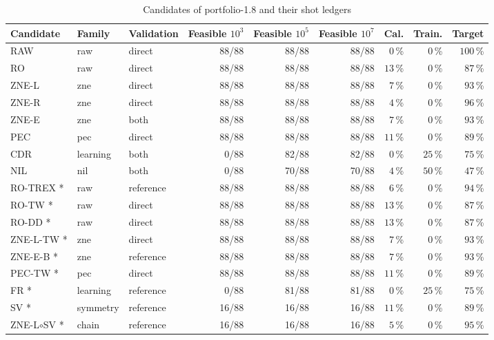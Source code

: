 \begin{table}[p]
\centering
\footnotesize
\setlength{\tabcolsep}{3.0pt}
\caption{Candidates of portfolio-1.8 and their shot ledgers}
\label{tab:qem180-candidates}
\begin{tabular}{lllrrrrrr}
\toprule
Candidate & Family & Validation & Feasible $10^3$ & Feasible $10^5$ & Feasible $10^7$ & Cal. & Train. & Target \\
\midrule
RAW & raw & direct & 88/88 & 88/88 & 88/88 & $0$\,\% & $0$\,\% & $100$\,\% \\
RO & raw & direct & 88/88 & 88/88 & 88/88 & $13$\,\% & $0$\,\% & $87$\,\% \\
ZNE-L & zne & direct & 88/88 & 88/88 & 88/88 & $7$\,\% & $0$\,\% & $93$\,\% \\
ZNE-R & zne & direct & 88/88 & 88/88 & 88/88 & $4$\,\% & $0$\,\% & $96$\,\% \\
ZNE-E & zne & both & 88/88 & 88/88 & 88/88 & $7$\,\% & $0$\,\% & $93$\,\% \\
PEC & pec & direct & 88/88 & 88/88 & 88/88 & $11$\,\% & $0$\,\% & $89$\,\% \\
CDR & learning & both & 0/88 & 82/88 & 82/88 & $0$\,\% & $25$\,\% & $75$\,\% \\
NIL & nil & both & 0/88 & 70/88 & 70/88 & $4$\,\% & $50$\,\% & $47$\,\% \\
RO-TREX * & raw & reference & 88/88 & 88/88 & 88/88 & $6$\,\% & $0$\,\% & $94$\,\% \\
RO-TW * & raw & direct & 88/88 & 88/88 & 88/88 & $13$\,\% & $0$\,\% & $87$\,\% \\
RO-DD * & raw & direct & 88/88 & 88/88 & 88/88 & $13$\,\% & $0$\,\% & $87$\,\% \\
ZNE-L-TW * & zne & direct & 88/88 & 88/88 & 88/88 & $7$\,\% & $0$\,\% & $93$\,\% \\
ZNE-E-B * & zne & reference & 88/88 & 88/88 & 88/88 & $7$\,\% & $0$\,\% & $93$\,\% \\
PEC-TW * & pec & direct & 88/88 & 88/88 & 88/88 & $11$\,\% & $0$\,\% & $89$\,\% \\
FR * & learning & reference & 0/88 & 81/88 & 81/88 & $0$\,\% & $25$\,\% & $75$\,\% \\
SV * & symmetry & reference & 16/88 & 16/88 & 16/88 & $11$\,\% & $0$\,\% & $89$\,\% \\
ZNE-L$\circ$SV * & chain & reference & 16/88 & 16/88 & 16/88 & $5$\,\% & $0$\,\% & $95$\,\% \\

\end{tabular}
\end{table}
